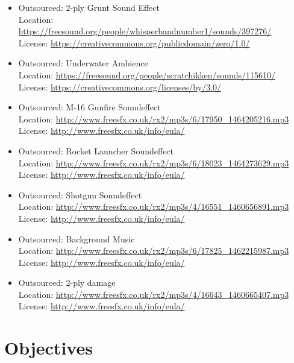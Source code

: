 \documentclass{article}
\begin{document}
\begin{itemize}
\item Outsourced: 2-ply Grunt Sound Effect\\
	Location:
\url{https://freesound.org/people/whisperbandnumber1/sounds/397276/}\\
	License:
\url{https://creativecommons.org/publicdomain/zero/1.0/}

\item Outsourced: Underwater Ambience\\
	Location:
\url{https://freesound.org/people/scratchikken/sounds/115610/}\\
	License:
\url{https://creativecommons.org/licenses/by/3.0/}

\item Outsourced: M-16 Gunfire Soundeffect\\
	Location:
\url{http://www.freesfx.co.uk/rx2/mp3s/6/17950_1464205216.mp3}\\
	License:
\url{http://www.freesfx.co.uk/info/eula/}

\item Outsourced: Rocket Launcher Soundeffect\\
	Location:
\url{http://www.freesfx.co.uk/rx2/mp3s/6/18023_1464273629.mp3}\\
	License:
\url{http://www.freesfx.co.uk/info/eula/}

\item Outsourced: Shotgun Soundeffect\\
	Location:
\url{http://www.freesfx.co.uk/rx2/mp3s/4/16551_1460656891.mp3}\\
	License:
\url{http://www.freesfx.co.uk/info/eula/}

\item Outsourced: Background Music\\
	Location:
\url{http://www.freesfx.co.uk/rx2/mp3s/6/17825_1462215987.mp3}\\
	License:
\url{http://www.freesfx.co.uk/info/eula/}

\item Outsourced: 2-ply damage\\
	Location:
\url{http://www.freesfx.co.uk/rx2/mp3s/4/16643_1460665407.mp3}\\
	License:
\url{http://www.freesfx.co.uk/info/eula/}



\end{itemize}

\section{Objectives}
\end{document}
